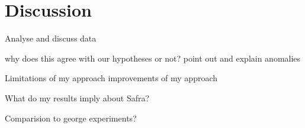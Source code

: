 \section{Discussion}

Analyse and discuss data

why does this agree with our hypotheses or not?
  point out and explain anomalies
  
Limitations of my approach
  improvements of my approach
  
What do my results imply about Safra?
  
Comparision to george experiments?